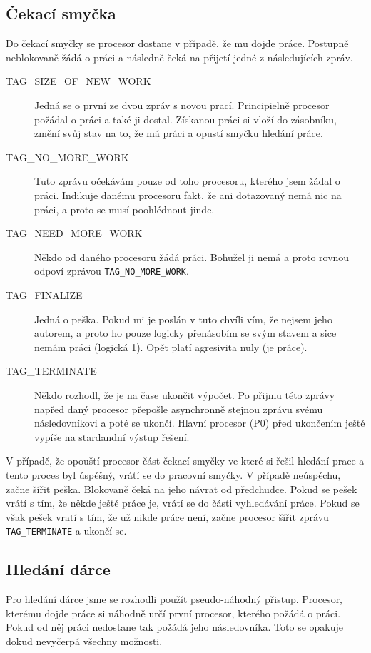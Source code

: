 \documentclass[12pt]{article}
\begin{document}
\subsection{Čekací smyčka}
Do čekací smyčky se procesor dostane v případě, že mu dojde práce. Postupně
neblokovaně žádá o práci a následně čeká na přijetí jedné z následujících zpráv.
\begin{description}
  \item [TAG\_SIZE\_OF\_NEW\_WORK] Jedná se o první ze dvou zpráv s novou prací.
Principielně procesor požádal o práci a také ji dostal. Získanou práci si vloží
do zásobníku, změní svůj stav na to, že má práci a opustí smyčku hledání práce.
  \item [TAG\_NO\_MORE\_WORK] Tuto zprávu očekávám pouze od toho procesoru,
kterého jsem žádal o práci. Indikuje danému procesoru fakt, že ani dotazovaný
nemá nic na práci, a proto se musí poohlédnout jinde.
  \item [TAG\_NEED\_MORE\_WORK] Někdo od daného procesoru žádá práci. Bohužel
ji nemá a proto rovnou odpoví zprávou \verb|TAG_NO_MORE_WORK|.
  \item [TAG\_FINALIZE] Jedná o peška. Pokud mi je poslán v tuto chvíli vím, že
nejsem jeho autorem, a proto ho pouze logicky přenásobím se svým stavem a sice
nemám práci (logická 1). Opět platí agresivita nuly (je práce).  
   \item [TAG\_TERMINATE] Někdo rozhodl, že je na čase ukončit výpočet. Po
přijmu této zprávy napřed daný procesor přepošle asynchronně stejnou zprávu
svému následovníkovi a poté se ukončí. Hlavní procesor (P0) před ukončením
ještě vypíše na stardandní výstup řešení.
\end{description}
V případě, že opouští procesor část čekací smyčky ve které si řešil hledání
prace a tento proces byl úspěšný, vrátí se do pracovní smyčky. V případě
neúspěchu, začne šířit peška. Blokovaně čeká na jeho návrat od předchudce. Pokud
se pešek vrátí s tím, že někde ještě práce je, vrátí se do části vyhledávání
práce. Pokud se však pešek vratí s tím, že už nikde práce není, začne
procesor šířit zprávu  \verb|TAG_TERMINATE| a ukončí se.
\subsection{Hledání dárce}
Pro hledání dárce jsme se rozhodli použít pseudo-náhodný přistup. Procesor,
kterému dojde práce si náhodně určí první procesor, kterého požádá o práci.
Pokud od něj práci nedostane tak požádá jeho následovníka. Toto se opakuje
dokud nevyčerpá všechny možnosti.
\end{document}

